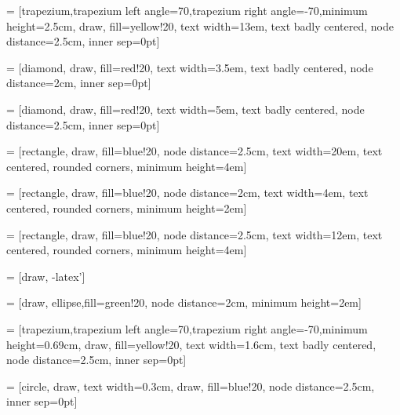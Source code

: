 	 = [trapezium,trapezium left angle=70,trapezium right angle=-70,minimum height=2.5cm, draw, fill=yellow!20, text width=13em, text badly centered, node distance=2.5cm, inner sep=0pt]

	 = [diamond, draw, fill=red!20, 
    text width=3.5em, text badly centered, node distance=2cm, inner sep=0pt]

	 = [diamond, draw, fill=red!20, 
    text width=5em, text badly centered, node distance=2.5cm, inner sep=0pt]
	
	 = [rectangle, draw, fill=blue!20, node distance=2.5cm,
    text width=20em, text centered, rounded corners, minimum height=4em]

     = [rectangle, draw, fill=blue!20, node distance=2cm,
    text width=4em, text centered, rounded corners, minimum height=2em]

     = [rectangle, draw, fill=blue!20, node distance=2.5cm,
    text width=12em, text centered, rounded corners, minimum height=4em]

     = [draw, -latex']
	
	 = [draw, ellipse,fill=green!20, node distance=2cm,
    minimum height=2em]

     = [trapezium,trapezium left angle=70,trapezium right angle=-70,minimum height=0.69cm, draw, fill=yellow!20, text width=1.6cm, text badly centered, node distance=2.5cm, inner sep=0pt]
    
     = [circle, draw, text width=0.3cm, draw, fill=blue!20, node distance=2.5cm, inner sep=0pt]    
        
